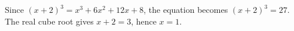 Since $(x+2)^3=x^3+6x^2+12x+8$, the equation becomes $(x+2)^3=27$. The real cube root gives $x+2=3$, hence $\boxed{x=1}$.
